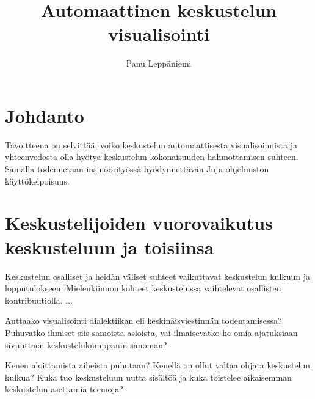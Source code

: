 \documentclass[11pt,a4paper,oneside]{memoir}
\author{Panu Leppäniemi}
\title{Automaattinen keskustelun visualisointi}
\begin{document}
\pagestyle{myheadings}
\markright{}



\pagestyle{empty} %
\tableofcontents*
\pagestyle{empty} %
\clearpage
\pagestyle{plain}




\setcounter{page}{1} %

\chapter{Johdanto}
Tavoitteena on selvittää, voiko keskustelun automaattisesta visualisoinnista ja yhteenvedosta olla hyötyä keskustelun kokonaisuuden hahmottamisen suhteen. Samalla todennetaan insinöörityössä hyödynnettävän Juju-ohjelmiston käyttökelpoisuus.

\chapter{Keskustelijoiden vuorovaikutus keskusteluun ja toisiinsa}
Keskustelun osalliset ja heidän väliset suhteet vaikuttavat keskustelun kulkuun ja lopputulokseen. Mielenkiinnon kohteet keskustelussa vaihtelevat osallisten kontribuutiolla. \cite[s. 1]{finding-topics-in-dynamical-text}
...

Auttaako visualisointi dialektiikan eli keskinäisviestinnän todentamisessa? Puhuvatko ihmiset siis samoista asioista, vai ilmaisevatko he omia ajatuksiaan sivuuttaen keskustelukumppanin sanoman?

Kenen aloittamista aiheista puhutaan? Kenellä on ollut valtaa ohjata keskustelun kulkua? Kuka tuo keskusteluun uutta sisältöä ja kuka toistelee aikaisemman keskustelun asettamia teemoja?
\end{document}
